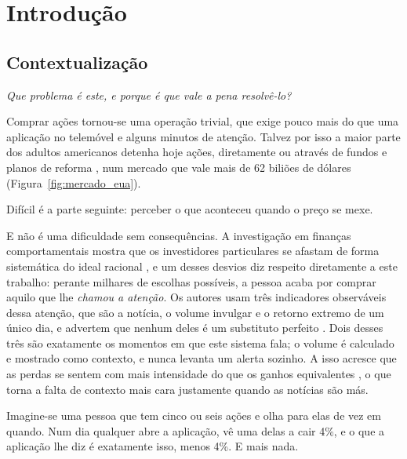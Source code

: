 
\chapter{Introdução}
\label{cap:introducao}

\section{Contextualização}
\label{sec:intro_origem}

\emph{Que problema é este, e porque é que vale a pena resolvê-lo?}

Comprar ações tornou-se uma operação trivial, que exige pouco mais do que uma aplicação no telemóvel
e alguns minutos de atenção. Talvez por isso a maior parte dos adultos americanos detenha hoje
ações, diretamente ou através de fundos e planos de reforma \autocite{gallup2025stock}, num mercado
que vale mais de 62 biliões de dólares \autocite{sifma2025factbook} (Figura~\ref{fig:mercado_eua}).

Difícil é a parte seguinte: perceber o que aconteceu quando o preço se mexe.

E não é uma dificuldade sem consequências. A investigação em finanças comportamentais mostra que os
investidores particulares se afastam de forma sistemática do ideal racional
\autocite{barberis2003behavioral}, e um desses desvios diz respeito diretamente a este trabalho:
perante milhares de escolhas possíveis, a pessoa acaba por comprar aquilo que lhe \emph{chamou a
atenção}. Os autores usam três indicadores observáveis dessa atenção, que são a notícia, o volume
invulgar e o retorno extremo de um único dia, e advertem que nenhum deles é um substituto perfeito
\autocite{barber2008glitters}. Dois desses três são exatamente os momentos em que este sistema
fala; o volume é calculado e mostrado como contexto, e nunca levanta um alerta sozinho. A isso acresce que as perdas se sentem com mais intensidade do que os ganhos
equivalentes \autocite{kahneman1979prospect}, o que torna a falta de contexto mais cara justamente
quando as notícias são más.

Imagine-se uma pessoa que tem cinco ou seis ações e olha para elas de vez em quando. Num dia
qualquer abre a aplicação, vê uma delas a cair 4\%, e o que a aplicação lhe diz é exatamente isso,
menos 4\%. E mais nada.

